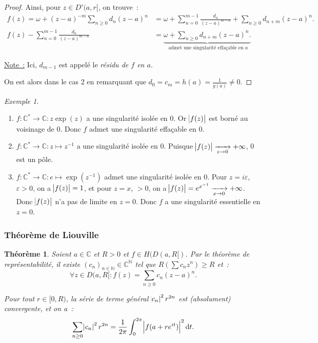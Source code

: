 \documentclass{report}
\newtheorem{thm}{Théorème}[chapter]
\theoremstyle{definition}
\theoremstyle{remark}
\newtheorem{ex}{Exemple}[chapter]
\numberwithin{equation}{section}
\newcommand{\C}{\mathbb C}
\newcommand{\N}{\mathbb N}
\newcommand{\pinfty}{{+\infty}}
\begin{document}
\begin{proof}
			Ainsi, pour $z \in D'(a, r[$, on trouve~:
			\begin{align}
				f(z) = \omega + (z-a)^{-m}\sum_{n \geq 0}d_n(z-a)^n &= \omega + \sum_{n=0}^{m-1}\frac {d_n}{(z-a)^{m-n}} + \sum_{n \geq 0}d_{n+m}(z-a)^n. \\
				f(z) - \sum_{n=0}^{m-1}\frac {d_n}{(z-a)^{m-n}} &= \underbrace {\omega + \sum_{n \geq 0}d_{n+m}(z-a)^n.}_{\text{ admet une singularité effaçable en $a$}}
			\end{align}

			\underline{Note~:} Ici, $d_{m-1}$ est appelé le \textit{résidu de $f$ en $a$}.

			On est alors dans le cas 2 en remarquant que $d_0 = c_m = h(a) = \frac 1{g(a)} \neq 0$.
			\end{proof}

			\begin{ex}~
			\begin{enumerate}
				\item $f : \C^* \to \C : z \exp(z)$ a une singularité isolée en $0$. Or $\abs {f(z)}$ est borné au voisinage de $0$. Donc $f$ admet une singularité
				effaçable en $0$.
				\item $f : \C^* \to \C : z \mapsto z^{-1}$ a une singularité isolée en $0$. Puisque $\abs {f(z)} \xrightarrow[z \to 0]{} \pinfty$, $0$ est un pôle.
				\item $f : \C^* \to \C : e \mapsto \exp(z^{-1})$ admet une singularité isolée en $0$. Pour $z = i\varepsilon$, $\varepsilon > 0$, on a $\abs {f(z)} = 1$,
				et pour $z = x$, $ > 0$, on a $\abs {f(z)} = e^{x^{-1}} \xrightarrow[x \to 0]{} \pinfty$. Donc $\abs {f(z)}$ n'a pas de limite en $z=0$. Donc $f$ a une
				singularité essentielle en $z=0$.
			\end{enumerate}
			\end{ex}

		\subsubsection{Théorème de Liouville}
			\begin{thm}\label{thm:pré-Liouville} Soient $a \in \C$ et $R > 0$ et $f \in H(D(a, R[)$. Par le théorème de représentabilité, il existe
			$(c_n)_{n \in \N} \in \C^\N$ tel que $R(\sum c_nz^n) \geq R$ et~:
			\begin{equation}
				\forall z \in D(a, R[ : f(z) = \sum_{n \geq 0}c_n(z-a)^n.
			\end{equation}

			Pour tout $r \in [0, R)$, la série de terme général $\abs {c_n}^2r^{2n}$ est (absolument) convergente, et on a~:
			\begin{equation}
				\sum_{n \geq 0}\abs {c_n}^2r^{2n} = \frac 1{2\pi}\int_0^{2\pi}\abs {f(a+re^{it})}^2\dif t.
			\end{equation}
			\end{thm}
\end{document}
